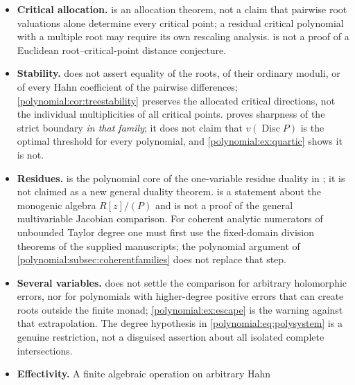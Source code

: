 \documentclass[11pt,letterpaper]{article}
\numberwithin{equation}{section}
\theoremstyle{definition}
\theoremstyle{remark}\newtheorem{remark}[theorem]{Remark}
\newcommand{\Disc}{\operatorname{Disc}}
\begin{document}
\begin{itemize}
\cref{polynomial:lem:initialderivative} cannot simply be removed: a constant
initial polynomial has zero derivative and does not determine the next nonzero
scale of $P'$. The argument can fail in positive residue characteristic, where
a nonconstant reduction may have zero derivative, and
\cref{polynomial:rem:rollehyp} records that a root-free ball is a genuinely
different case.
\item \textbf{Critical allocation.}  is an
allocation theorem, not a claim that pairwise root valuations alone determine
every critical point; a residual critical polynomial with a multiple root may
require its own rescaling analysis.  is not a
proof of a Euclidean root--critical-point distance conjecture.
\item \textbf{Stability.}  does not assert
equality of the roots, of their ordinary moduli, or of every Hahn coefficient
of the pairwise differences; \cref{polynomial:cor:treestability} preserves the
allocated critical directions, not the individual multiplicities of all
critical points.  proves sharpness of the strict
boundary \emph{in that family}; it does not claim that $v(\Disc P)$ is the
optimal threshold for every polynomial, and
\cref{polynomial:ex:quartic} shows it is not.
\item \textbf{Residues.}  is the
polynomial core of the one-variable residue duality in
\cite{polynomial:SourceResearch}; it is not claimed as a new general duality
theorem.  is a statement about the monogenic
algebra $R[z]/(P)$ and is not a proof of the general multivariable Jacobian
comparison. For coherent analytic numerators of unbounded Taylor degree one
must first use the fixed-domain division theorems of the supplied manuscripts;
the polynomial argument of
\cref{polynomial:subsec:coherentfamilies} does not replace that step.
\item \textbf{Several variables.} 
does not settle the comparison for arbitrary holomorphic errors, nor for
polynomials with higher-degree positive errors that can create roots outside
the finite monad; \cref{polynomial:ex:escape} is the warning against that
extrapolation. The degree hypothesis in
\eqref{polynomial:eq:polysystem} is a genuine restriction, not a disguised
assertion about all isolated complete intersections.
\item \textbf{Effectivity.} A finite algebraic operation on arbitrary Hahn

\end{itemize}
\end{document}
